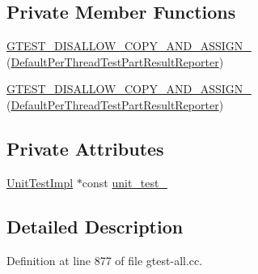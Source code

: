 \subsection*{\-Private \-Member \-Functions}
\begin{DoxyCompactItemize}
\item 
\hyperlink{classtesting_1_1internal_1_1DefaultPerThreadTestPartResultReporter_a2d81910afc9f2bd746d6a26734c1219c}{\-G\-T\-E\-S\-T\-\_\-\-D\-I\-S\-A\-L\-L\-O\-W\-\_\-\-C\-O\-P\-Y\-\_\-\-A\-N\-D\-\_\-\-A\-S\-S\-I\-G\-N\-\_\-} (\hyperlink{classtesting_1_1internal_1_1DefaultPerThreadTestPartResultReporter}{\-Default\-Per\-Thread\-Test\-Part\-Result\-Reporter})
\item 
\hyperlink{classtesting_1_1internal_1_1DefaultPerThreadTestPartResultReporter_a2d81910afc9f2bd746d6a26734c1219c}{\-G\-T\-E\-S\-T\-\_\-\-D\-I\-S\-A\-L\-L\-O\-W\-\_\-\-C\-O\-P\-Y\-\_\-\-A\-N\-D\-\_\-\-A\-S\-S\-I\-G\-N\-\_\-} (\hyperlink{classtesting_1_1internal_1_1DefaultPerThreadTestPartResultReporter}{\-Default\-Per\-Thread\-Test\-Part\-Result\-Reporter})
\end{DoxyCompactItemize}
\subsection*{\-Private \-Attributes}
\begin{DoxyCompactItemize}
\item 
\hyperlink{classtesting_1_1internal_1_1UnitTestImpl}{\-Unit\-Test\-Impl} $\ast$const \hyperlink{classtesting_1_1internal_1_1DefaultPerThreadTestPartResultReporter_a82c5334452afe614170bbc7ee736969c}{unit\-\_\-test\-\_\-}
\end{DoxyCompactItemize}


\subsection{\-Detailed \-Description}


\-Definition at line 877 of file gtest-\/all.\-cc.



